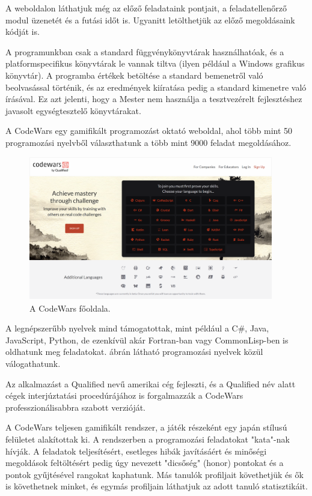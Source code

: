 A weboldalon láthatjuk még az előző feladataink pontjait, a feladatellenőrző modul üzenetét és a futási időt is. Ugyanitt letölthetjük az előző megoldásaink kódját is.

A programunkban csak a standard függvénykönyvtárak használhatóak, és a platformspecifikus könyvtárak le vannak tiltva (ilyen például a Windows grafikus könyvtár). A programba értékek betöltése a standard bemenetről való beolvasással történik, és az eredmények kiíratása pedig a standard kimenetre való írásával. Ez azt jelenti, hogy a Mester nem használja a tesztvezérelt fejlesztéshez javasolt egységtesztelő könyvtárakat.


A CodeWars egy gamifikált programozást oktató weboldal, ahol több mint 50 programozási nyelvből választhatunk a több mint 9000 feladat megoldásához. \cite{codewars}

\begin{figure}[h]
    \centering
    \includegraphics[width=0.95\textwidth]{images/codewars_homepage.png}
    \caption{A CodeWars főoldala.}
    \label{fig:codewars_homepage}
\end{figure}

A legnépszerűbb nyelvek mind támogatottak, mint például a C\#, Java, JavaScript, Python, de ezenkívül akár Fortran-ban vagy CommonLisp-ben is oldhatunk meg feladatokat.  ábrán látható programozási nyelvek közül válogathatunk.

Az alkalmazást a Qualified nevű amerikai cég fejleszti, és a Qualified név alatt cégek interjúztatási procedúrájához is forgalmazzák a CodeWars professzionálisabbra szabott verzióját. \cite{qualified}

A CodeWars teljesen gamifikált rendszer, a játék részeként egy japán stílusú felületet alakítottak ki. A rendszerben a programozási feladatokat "kata"-nak hívják. A feladatok teljesítésért, esetleges hibák javításáért és minőségi megoldások feltöltésért pedig úgy nevezett "dicsőség" (honor) pontokat és a pontok gyűjtésével rangokat kaphatunk. Más tanulók profiljait követhetjük és ők is követhetnek minket, és egymás profiljain láthatjuk az adott tanuló statisztikáit.

